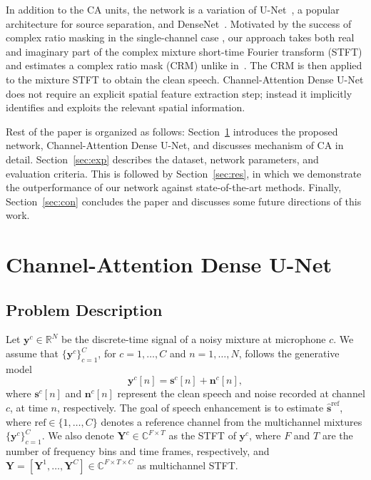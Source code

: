 \documentclass{article}
\newcommand{\n}{\mathbf{n}}
\newcommand{\s}{\mathbf{s}}
\newcommand{\y}{\mathbf{y}}
\newcommand{\Bigy}{\mathbf{Y}}
\newcommand{\R}{{\mathbb{R}}}
\begin{document}
In addition to the CA units, the network is a variation of U-Net~\cite{unet}, a popular architecture for source separation, and DenseNet~\cite{denseNet}. Motivated by the success of complex ratio masking in the single-channel case \cite{crm}, our approach takes both real and imaginary part of the complex mixture short-time Fourier transform (STFT) and estimates a complex ratio mask (CRM) unlike in~\cite{wang2018multi, TFmask}. The CRM is then applied to the mixture STFT to obtain the clean speech. Channel-Attention Dense U-Net does not require an explicit spatial feature extraction step; instead it implicitly identifies and exploits the relevant spatial information.

Rest of the paper is organized as follows: Section~\ref{sec:saunet} introduces the proposed network, Channel-Attention Dense U-Net, and discusses mechanism of CA in detail. Section~\ref{sec:exp} describes the dataset, network parameters, and evaluation criteria. This is followed by Section~\ref{sec:res}, in which we demonstrate the outperformance of our network against state-of-the-art methods. Finally, Section~\ref{sec:con} concludes the paper and discusses some future directions of this work.





\section{Channel-Attention Dense U-Net}
\label{sec:saunet}
\subsection{Problem Description}
\label{sec:model}
Let $\y^c \in \R^{N}$ be the discrete-time signal of a noisy mixture at microphone $c$. We assume that $\{\y^c\}_{c=1}^C$, for $c=1,\ldots,C$ and $n=1,\ldots,N$, follows the generative model
\begin{equation}\label{eq:gen}
\y^{c}[n] = \s^{c}[n] + \n^{c}[n],
\end{equation}
\noindent where $\s^{c}[n]$ and $\n^{c}[n]$ represent the clean speech and noise recorded at channel $c$, at time $n$, respectively. The goal of speech enhancement is to estimate $\hat{\s}^{\text{ref}}$, where $\text{ref}\in\{1,\ldots,C\}$ denotes a reference channel from the multichannel mixtures $\{\y^c\}_{c=1}^C$. We also denote $\Bigy^c\in \mathbb{C}^{F\times T}$ as the STFT of $\y^c$, where $F$ and $T$ are the number of frequency bins and time frames, respectively, and $\Bigy = [\Bigy^1, \ldots, \Bigy^C]  \in \mathbb{C}^{F \times T \times C}$ as multichannel STFT.
\end{document}
